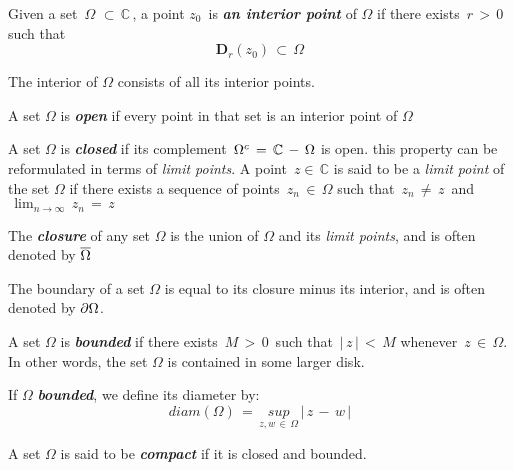 \documentclass[11pt]{article}
\begin{document}
    Given a set \(\,\Omega\,\,\subset\,\mathbb{C}\,\), a point \(z_{0}\,\)
is \textbf{\emph{an interior point}} of \(\Omega\) if there exists
\(\,r\,>\,0\) such that \[ \mathbf{D}_{r}(z_{0})\,\subset\,\Omega\]

The interior of \(\Omega\) consists of all its interior points.

A set \(\Omega\) is \textbf{\emph{open}} if every point in that set is
an interior point of \(\Omega\)

A set \(\Omega\) is \textbf{\emph{closed}} if its complement
\(\,\Omega^{\small{c}}\,=\,\mathbb{C}\,-\,\Omega\) is open. this
property can be reformulated in terms of \emph{limit points}. A point
\(\,z\in\,\mathbb{C}\) is said to be a \emph{limit point} of the set
\(\Omega\) if there exists a sequence of points \(\,z_{n}\,\in\,\Omega\)
such that \(\,z_{n}\,\ne\,z\,\) and
\(\,\lim_{n\to\infty}{\,z_{n}\,=\,z}\)

The \textbf{\emph{closure}} of any set \(\Omega\) is the union of
\(\Omega\) and its \emph{limit points}, and is often denoted by
\(\huge \overline{\Omega}\)

The boundary of a set \(\Omega\) is equal to its closure minus its
interior, and is often denoted by \(\huge\partial\Omega\).

A set \(\Omega\) is \textbf{\emph{bounded}} if there exists
\(\,M\,>\,0\,\) such that \(\,|\,z\,|\,<\,M\) whenever
\(\,z\,\in\,\Omega\). In other words, the set \(\Omega\) is contained in
some larger disk.

If \(\Omega\) \textbf{\emph{bounded}}, we define its diameter by:
\[ diam(\Omega)\,=\,\underset{z,w\,\in\,\Omega}{sup}\,|\,z\,-\,w\,|\]

A set \(\Omega\) is said to be \textbf{\emph{compact}} if it is closed
and bounded.
\end{document}
